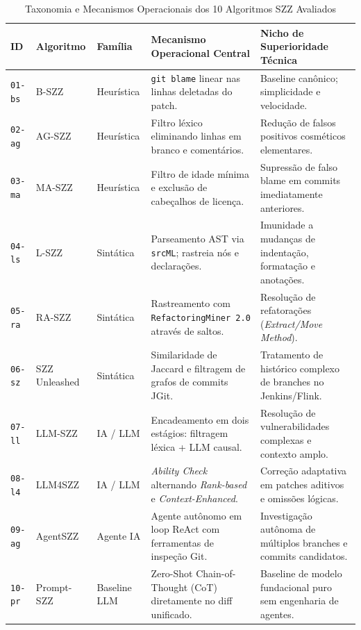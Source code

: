 \documentclass[10pt,journal,compsoc]{IEEEtran}
\begin{document}
\begin{table}[t]
\centering
\caption{Taxonomia e Mecanismos Operacionais dos 10 Algoritmos SZZ Avaliados}
\label{tab:metodos}
\begin{tabularx}{\textwidth}{lp{3.2cm}lp{5cm}X}
\toprule
\textbf{ID} & \textbf{Algoritmo} & \textbf{Família} & \textbf{Mecanismo Operacional Central} & \textbf{Nicho de Superioridade Técnica} \\
\midrule
\texttt{01-bs} & B-SZZ \cite{sliwerski2005changes} & Heurística & \texttt{git blame} linear nas linhas deletadas do patch. & Baseline canônico; simplicidade e velocidade. \\
\texttt{02-ag} & AG-SZZ \cite{kim2006automatic} & Heurística & Filtro léxico eliminando linhas em branco e comentários. & Redução de falsos positivos cosméticos elementares. \\
\texttt{03-ma} & MA-SZZ \cite{dacosta2017evaluating} & Heurística & Filtro de idade mínima e exclusão de cabeçalhos de licença. & Supressão de falso blame em commits imediatamente anteriores. \\
\texttt{04-ls} & L-SZZ \cite{rosa2021evaluating} & Sintática & Parseamento AST via \texttt{srcML}; rastreia nós e declarações. & Imunidade a mudanças de indentação, formatação e anotações. \\
\texttt{05-ra} & RA-SZZ \cite{fan2021impact} & Sintática & Rastreamento com \texttt{RefactoringMiner 2.0} através de saltos. & Resolução de refatorações (\textit{Extract/Move Method}). \\
\texttt{06-sz} & SZZ Unleashed \cite{borg2019szz} & Sintática & Similaridade de Jaccard e filtragem de grafos de commits JGit. & Tratamento de histórico complexo de branches no Jenkins/Flink. \\
\texttt{07-ll} & LLM-SZZ \cite{fan2024vulnerability} & IA / LLM & Encadeamento em dois estágios: filtragem léxica + LLM causal. & Resolução de vulnerabilidades complexas e contexto amplo. \\
\texttt{08-l4} & LLM4SZZ \cite{tang2025llm4szz} & IA / LLM & \textit{Ability Check} alternando \textit{Rank-based} e \textit{Context-Enhanced}. & Correção adaptativa em patches aditivos e omissões lógicas. \\
\texttt{09-ag} & AgentSZZ \cite{risse2026agentszz} & Agente IA & Agente autônomo em loop ReAct com ferramentas de inspeção Git. & Investigação autônoma de múltiplos branches e commits candidatos. \\
\texttt{10-pr} & Prompt-SZZ & Baseline LLM & Zero-Shot Chain-of-Thought (CoT) diretamente no diff unificado. & Baseline de modelo fundacional puro sem engenharia de agentes. \\
\bottomrule
\end{tabularx}
\end{table}
\end{document}
